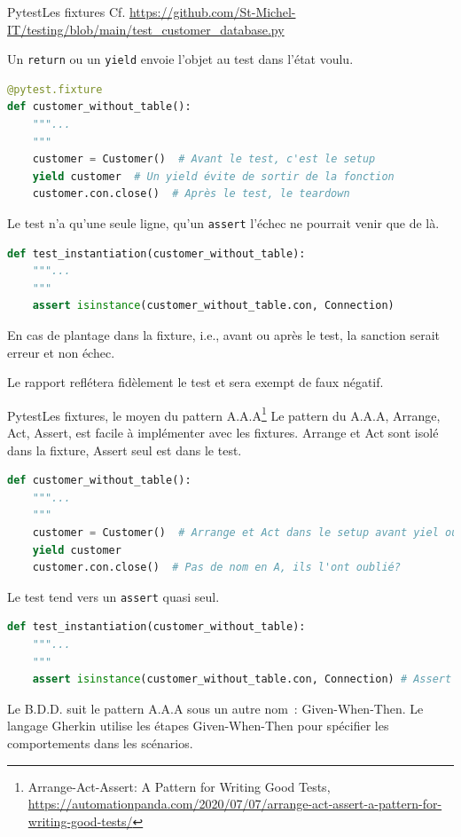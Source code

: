 \documentclass{beamer}
\begin{document}
    \begin{frame}[fragile]{Pytest}{Les fixtures}
        \transdissolve
        Cf. \url{https://github.com/St-Michel-IT/testing/blob/main/test_customer_database.py}

        Un \lstinline{return} ou un \lstinline{yield} envoie l'objet au test dans l'état voulu.
        \begin{lstlisting}[language=Python]
@pytest.fixture
def customer_without_table():
    """...
    """
    customer = Customer()  # Avant le test, c'est le setup
    yield customer  # Un yield évite de sortir de la fonction
    customer.con.close()  # Après le test, le teardown
        \end{lstlisting}
        Le test n'a qu'une seule ligne, qu'un \lstinline{assert} l'échec ne
        pourrait venir que de là.
        \begin{lstlisting}[language=Python]
def test_instantiation(customer_without_table):
    """...
    """
    assert isinstance(customer_without_table.con, Connection)
        \end{lstlisting}
        En cas de plantage dans la fixture, i.e., avant ou après le test, la sanction
        serait erreur et non échec.

        Le rapport reflétera fidèlement le test et sera exempt de faux négatif.
    \end{frame}

    \begin{frame}[fragile]{Pytest}{Les fixtures, le moyen du pattern A.A.A\footnote{Arrange-Act-Assert: A Pattern for Writing Good Tests, \url{https://automationpanda.com/2020/07/07/arrange-act-assert-a-pattern-for-writing-good-tests/}}}
        \transdissolve
        Le pattern du A.A.A, Arrange, Act, Assert, est facile à implémenter avec les fixtures.
        Arrange et Act sont isolé dans la fixture, Assert seul est dans le test.

        \begin{lstlisting}[language=Python]
def customer_without_table():
    """...
    """
    customer = Customer()  # Arrange et Act dans le setup avant yiel ou return
    yield customer
    customer.con.close()  # Pas de nom en A, ils l'ont oublié?
        \end{lstlisting}
        Le test tend vers un \lstinline{assert} quasi seul.
        \begin{lstlisting}[language=Python]
def test_instantiation(customer_without_table):
    """...
    """
    assert isinstance(customer_without_table.con, Connection) # Assert
        \end{lstlisting}
        Le B.D.D. suit le pattern A.A.A sous un autre nom~: Given-When-Then.
        Le langage Gherkin utilise les étapes Given-When-Then pour spécifier les comportements dans les scénarios.
    \end{frame}
\end{document}
